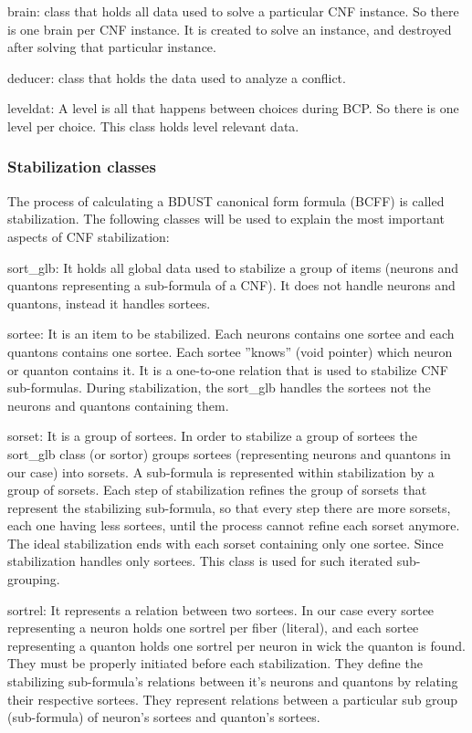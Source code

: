 \documentclass{easychair}
\newcommand{\neuron}{\textsf{neuron}}
\newcommand{\quanton}{\textsf{quanton}}
\newcommand{\brain}{\textsf{brain}}
\newcommand{\deducer}{\textsf{deducer}}
\newcommand{\leveldat}{\textsf{leveldat}}
\newcommand{\sortglb}{\textsf{sort\_glb}}
\newcommand{\sortee}{\textsf{sortee}}
\newcommand{\sorset}{\textsf{sorset}}
\newcommand{\sortrel}{\textsf{sortrel}}
\begin{document}
{\brain}: class that holds all data used to solve a particular CNF instance. So there is one {\brain} per CNF instance. It is created to solve an instance, and destroyed after solving that particular instance.

{\deducer}: class that holds the data used to analyze a conflict.

{\leveldat}: A level is all that happens between choices during BCP. So there is one level per choice. This class holds level relevant data.

\subsubsection{Stabilization classes}

The process of calculating a BDUST canonical form formula (BCFF) is called stabilization. The following classes will be used to explain the most important aspects of CNF stabilization:

{\sortglb}: It holds all global data used to stabilize a group of items ({\neuron}s and {\quanton}s representing a sub-formula of a CNF). It does not handle {\neuron}s and {\quanton}s, instead it handles {\sortee}s.

{\sortee}: It is an item to be stabilized. Each {\neuron}s contains one {\sortee} and each {\quanton}s contains one {\sortee}. Each {\sortee} ''knows'' (void pointer) which {\neuron} or {\quanton} contains it. It is a one-to-one relation that is used to stabilize CNF sub-formulas. During stabilization, the {\sortglb} handles the {\sortee}s not the {\neuron}s and {\quanton}s containing them.

{\sorset}: It is a group of {\sortee}s. In  order to stabilize a group of {\sortee}s the {\sortglb} class (or sortor) groups {\sortee}s (representing {\neuron}s and {\quanton}s in our case) into {\sorset}s. A sub-formula is represented within stabilization by a group of {\sorset}s. Each step of stabilization refines the group of {\sorset}s that represent the stabilizing sub-formula, so that every step there are more {\sorset}s, each one having less {\sortee}s, until the process cannot refine each {\sorset} anymore. The ideal stabilization ends with each {\sorset} containing only one {\sortee}. Since stabilization handles only {\sortee}s. This class is used for such iterated sub-grouping.

{\sortrel}: It represents a relation between two {\sortee}s. In our case every {\sortee} representing a {\neuron} holds one {\sortrel} per fiber (literal), and each {\sortee} representing a {\quanton} holds one {\sortrel} per {\neuron} in wick the {\quanton} is found. They must be properly initiated before each stabilization. They define the stabilizing sub-formula's relations between it's {\neuron}s and {\quanton}s by relating their respective {\sortee}s. They represent relations between a particular sub group (sub-formula) of {\neuron}'s {\sortee}s and {\quanton}'s {\sortee}s.
\end{document}
